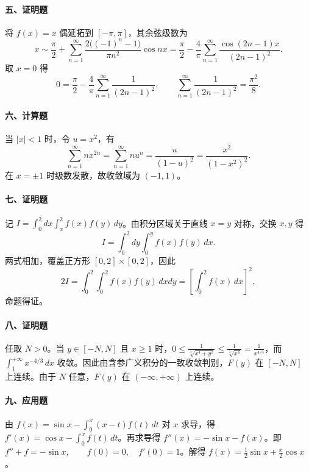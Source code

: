 \paragraph*{五、证明题}

将 $f(x)=x$ 偶延拓到 $[-\pi,\pi]$，其余弦级数为
\[
  x\sim \frac{\pi}{2}
  +\sum_{n=1}^{\infty}\frac{2\big((-1)^n-1\big)}{\pi n^2}\cos nx
  =
  \frac{\pi}{2}
  -\frac{4}{\pi}\sum_{n=1}^{\infty}\frac{\cos(2n-1)x}{(2n-1)^2}.
\]
取 $x=0$ 得
\[
  0=\frac{\pi}{2}
  -\frac{4}{\pi}\sum_{n=1}^{\infty}\frac1{(2n-1)^2},
  \qquad
  \sum_{n=1}^{\infty}\frac1{(2n-1)^2}=\frac{\pi^2}{8}.
\]

\paragraph*{六、计算题}

当 $|x|<1$ 时，令 $u=x^2$，有
\[
  \sum_{n=1}^{\infty}nx^{2n}
  =
  \sum_{n=1}^{\infty}nu^n
  =
  \frac{u}{(1-u)^2}
  =
  \frac{x^2}{(1-x^2)^2}.
\]
在 $x=\pm1$ 时级数发散，故收敛域为 $(-1,1)$。

\paragraph*{七、证明题}

记 \(\displaystyle I=\int_0^2 dx\int_x^2 f(x)f(y)\,dy\)。由积分区域关于直线 $x=y$ 对称，交换 $x,y$ 得
\[
I=\int_0^2 dy\int_0^y f(x)f(y)\,dx.
\]
两式相加，覆盖正方形 $[0,2]\times[0,2]$，因此
\[
2I=\int_0^2\int_0^2 f(x)f(y)\,dxdy=\left[\int_0^2 f(x)\,dx\right]^2,
\]
命题得证。

\paragraph*{八、证明题}

任取 $N>0$。当 $y\in[-N,N]$ 且 $x\ge1$ 时，\(\displaystyle 0\le \frac1{\sqrt[3]{x^4+y^2}}\le \frac1{\sqrt[3]{x^4}}=\frac1{x^{4/3}}\)，而 $\int_1^{+\infty}x^{-4/3}\,dx$ 收敛。因此由含参广义积分的一致收敛判别，$F(y)$ 在 $[-N,N]$ 上连续。由于 $N$ 任意，$F(y)$ 在 $(-\infty,+\infty)$ 上连续。

\paragraph*{九、应用题}

由 \(\displaystyle f(x)=\sin x-\int_0^x(x-t)f(t)\,dt\) 对 $x$ 求导，得
\(\displaystyle f'(x)=\cos x-\int_0^x f(t)\,dt\)。再求导得 \(\displaystyle f''(x)=-\sin x-f(x)\)。即
\(\displaystyle f''+f=-\sin x,\qquad f(0)=0,\quad f'(0)=1\)。解得
\(\displaystyle f(x)=\frac12\sin x+\frac{x}{2}\cos x\)。


